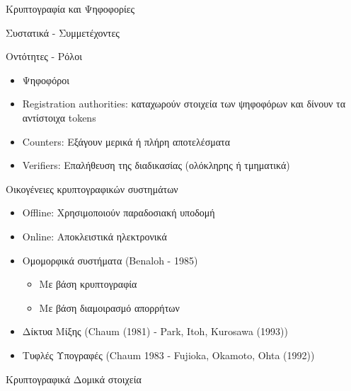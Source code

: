 \documentclass[handout]{beamer}
\begin{document}
\begin{section}{Κρυπτογραφία και Ψηφοφορίες}
\begin{frame}[allowframebreaks]{Συστατικά - Συμμετέχοντες}
\framebreak

\begin{block}{Οντότητες - Ρόλοι}
\begin{itemize}
\item Ψηφοφόροι 
\item Registration authorities: καταχωρούν στοιχεία των ψηφοφόρων και δίνουν τα αντίστοιχα tokens 
\item Counters: Εξάγουν μερικά ή πλήρη αποτελέσματα 
\item Verifiers: Επαλήθευση της  διαδικασίας (ολόκληρης ή τμηματικά)
\end{itemize}
\end{block}

\end{frame}

\begin{frame}{Οικογένειες κρυπτογραφικών συστημάτων}
\begin{itemize}
\item Offline: Χρησιμοποιούν παραδοσιακή υποδομή \pause 
\item Online: Αποκλειστικά ηλεκτρονικά \pause 
\end{itemize}

\begin{itemize}
    \item Ομομορφικά συστήματα (Benaloh - 1985) \pause 
    \begin{itemize}
        \item Με βάση κρυπτογραφία
        \item Με βάση διαμοιρασμό απορρήτων
    \end{itemize} \pause 
    \item Δίκτυα Μίξης (Chaum (1981) - Park, Itoh, Kurosawa (1993)) \pause 
    \item Τυφλές Υπογραφές (Chaum 1983 - Fujioka, Okamoto, Ohta (1992))
\end{itemize}
\end{frame}

\begin{frame}[allowframebreaks]{Κρυπτογραφικά Δομικά στοιχεία} 


\end{frame}
\end{section}
\end{document}
